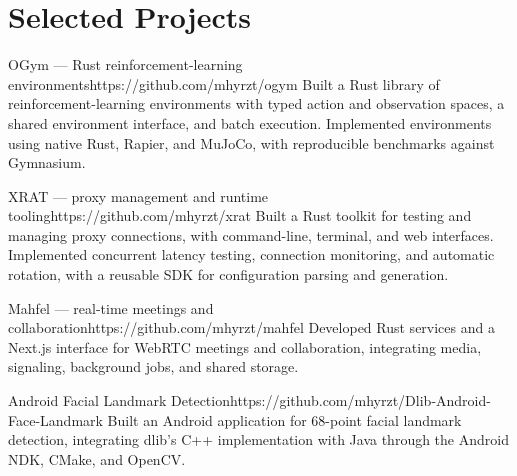 \section{Selected Projects}
\begin{projectentry}{OGym --- Rust reinforcement-learning environments}{https://github.com/mhyrzt/ogym}
Built a Rust library of reinforcement-learning environments with typed action and observation spaces, a shared environment interface, and batch execution. Implemented environments using native Rust, Rapier, and MuJoCo, with reproducible benchmarks against Gymnasium.
\end{projectentry}

\begin{projectentry}{XRAT --- proxy management and runtime tooling}{https://github.com/mhyrzt/xrat}
Built a Rust toolkit for testing and managing proxy connections, with command-line, terminal, and web interfaces. Implemented concurrent latency testing, connection monitoring, and automatic rotation, with a reusable SDK for configuration parsing and generation.
\end{projectentry}

\begin{projectentry}{Mahfel --- real-time meetings and collaboration}{https://github.com/mhyrzt/mahfel}
Developed Rust services and a Next.js interface for WebRTC meetings and collaboration, integrating media, signaling, background jobs, and shared storage.
\end{projectentry}

\begin{projectentry}{Android Facial Landmark Detection}{https://github.com/mhyrzt/Dlib-Android-Face-Landmark}
Built an Android application for 68-point facial landmark detection, integrating dlib's C++ implementation with Java through the Android NDK, CMake, and OpenCV.
\end{projectentry}
